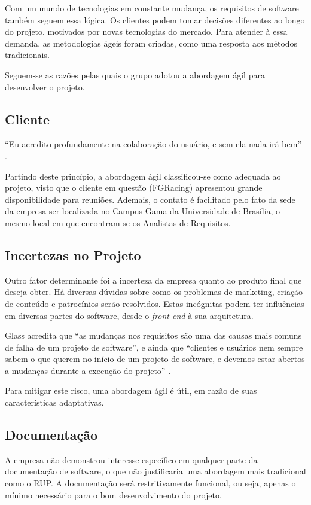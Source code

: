 Com um mundo de tecnologias em constante mudança, os requisitos de software também seguem essa lógica. Os clientes podem
tomar decisões diferentes ao longo do projeto, motivados por novas tecnologias do mercado. Para atender à essa demanda,
as metodologias ágeis foram criadas, como uma resposta aos métodos tradicionais.

Seguem-se as razões pelas quais o grupo adotou a abordagem ágil para desenvolver o projeto.

\subsection{Cliente}
“Eu acredito profundamente na colaboração do usuário, e sem ela nada irá bem” \cite{glass2001}.

Partindo deste princípio, a abordagem ágil classificou-se como adequada ao projeto, visto que o cliente em questão (FGRacing)
 apresentou grande disponibilidade para reuniões. Ademais, o contato é facilitado pelo fato da sede da empresa ser localizada
  no Campus Gama da Universidade de Brasília, o mesmo local em que encontram-se os Analistas de Requisitos.

\subsection{Incertezas no Projeto}
Outro fator determinante foi a incerteza da empresa quanto ao produto final que deseja obter. Há diversas dúvidas sobre
como os problemas de marketing, criação de conteúdo e patrocínios serão resolvidos. Estas incógnitas podem ter influências
em diversas partes do software, desde o \textit{front-end} à sua arquitetura.

Glass acredita que “as mudanças nos requisitos são uma das causas mais comuns de falha de um projeto de software”,
e ainda que “clientes e usuários nem sempre sabem o que querem no início de um projeto de software, e devemos estar abertos
a mudanças durante a execução do projeto” \cite{glass2001}.

Para mitigar este risco, uma abordagem ágil é útil, em razão de suas características adaptativas.

\subsection{Documentação}
A empresa não demonstrou interesse específico em qualquer parte da documentação de software, o que não justificaria
uma abordagem mais tradicional como o RUP. A documentação será restritivamente funcional, ou seja, apenas o mínimo
necessário para o bom desenvolvimento do projeto.

